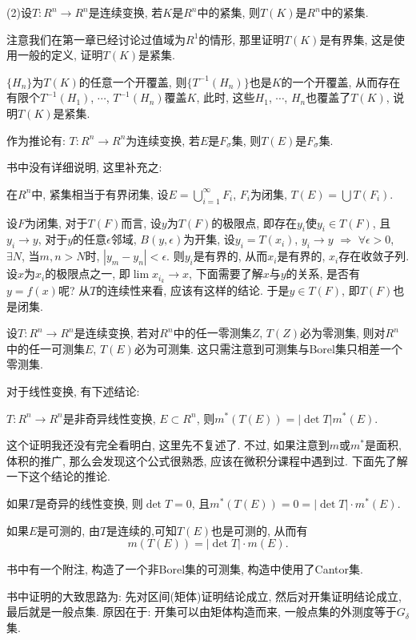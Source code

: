 \documentclass[12pt,a4paper,openany]{book}
\begin{document}
(2)设$T: R^n \rightarrow R^n$是连续变换, 若$K$是$R^n$中的紧集, 则$T(K)$是$R^n$中的紧集.

注意我们在第一章已经讨论过值域为$R^1$的情形, 那里证明$T(K)$是有界集, 这是使用一般的定义, 证明$T(K)$是紧集.

$\{H_n\}$为$T(K)$的任意一个开覆盖, 则$\{T^{-1}(H_n)\}$也是$K$的一个开覆盖, 从而存在有限个$T^{-1}(H_1)$, $\cdots$, $T^{-1}(H_n)$覆盖$K$, 此时, 这些$H_1$, $\cdots$, $H_n$也覆盖了$T(K)$, 说明$T(K)$是紧集.

作为推论有: $T: R^n \rightarrow R^n$为连续变换, 若$E$是$F_{\sigma}$集, 则$T(E)$是$F_{\sigma}$集.

书中没有详细说明, 这里补充之:

在$R^n$中, 紧集相当于有界闭集, 设$E = \bigcup_{i=1}^{\infty}{F_i}$, $F_i$为闭集, $T(E) = \bigcup{T(F_i)}$.

设$F$为闭集, 对于$T(F)$而言, 设$y$为$T(F)$的极限点, 即存在$y_i$使$y_i \in T(F)$, 且$y_i \rightarrow y$, 对于$y$的任意$\epsilon$邻域, $B(y, \epsilon)$为开集, 设$y_i = T(x_i)$, $y_i \rightarrow y$ $\Rightarrow$ $\forall \epsilon > 0$, $\exists N$, 当$m, n > N$时, $|y_m - y_n| < \epsilon$. 则$y_i$是有界的, 从而$x_i$是有界的, $x_i$存在收敛子列. 设$x$为$x_i$的极限点之一, 即$\lim{x_{i_k}} \rightarrow x$, 下面需要了解$x$与$y$的关系, 是否有$y = f(x)$呢? 从$T$的连续性来看, 应该有这样的结论. 于是$y \in T(F)$, 即$T(F)$也是闭集.

设$T: R^n \rightarrow R^n$是连续变换, 若对$R^n$中的任一零测集$Z$, $T(Z)$必为零测集, 则对$R^n$中的任一可测集$E$, $T(E)$必为可测集. 这只需注意到可测集与Borel集只相差一个零测集.

对于线性变换, 有下述结论:

$T: R^n \rightarrow R^n$是非奇异线性变换, $E \subset R^n$, 则$m^*(T(E)) = |\det{T}|m^*(E)$.

这个证明我还没有完全看明白, 这里先不复述了. 不过, 如果注意到$m$或$m^*$是面积, 体积的推广, 那么会发现这个公式很熟悉, 应该在微积分课程中遇到过. 下面先了解一下这个结论的推论.

如果$T$是奇异的线性变换, 则$\det{T} = 0$, 且$m^*(T(E)) = 0 =|\det{T}|\cdot m^*(E)$.

如果$E$是可测的, 由$T$是连续的,可知$T(E)$也是可测的, 从而有
\[
m(T(E)) = |\det{T}| \cdot m(E).
\]

书中有一个附注, 构造了一个非Borel集的可测集, 构造中使用了Cantor集.

书中证明的大致思路为: 先对区间(矩体)证明结论成立, 然后对开集证明结论成立, 最后就是一般点集. 原因在于: 开集可以由矩体构造而来, 一般点集的外测度等于$G_{\delta}$集.
\end{document}
